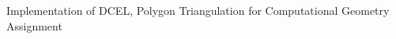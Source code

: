 \label{index_md_Readme}%
%
Implementation of D\+C\+EL, Polygon Triangulation for Computational Geometry Assignment 
